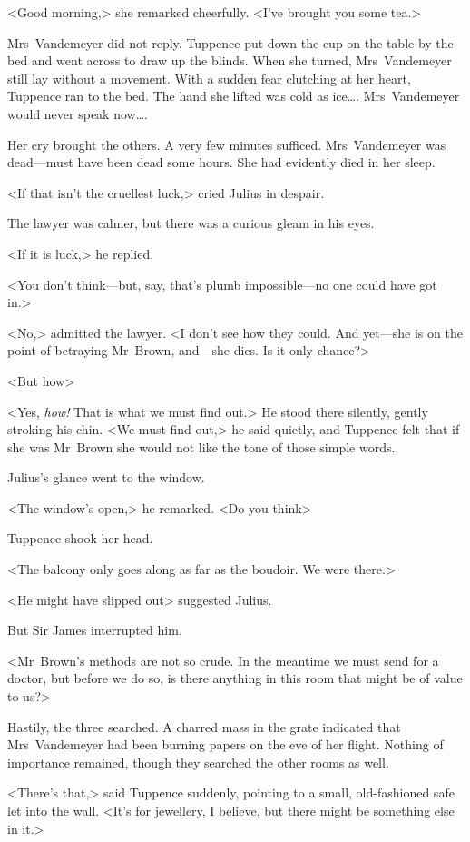 <Good morning,> she remarked cheerfully. <I've brought you some tea.>

Mrs~Vandemeyer did not reply. Tuppence put down the cup on the table by the bed and went across to draw up the blinds. When she turned, Mrs~Vandemeyer still lay without a movement. With a sudden fear clutching at her heart, Tuppence ran to the bed. The hand she lifted was cold as ice\dots. Mrs~Vandemeyer would never speak now\dots.

Her cry brought the others. A very few minutes sufficed. Mrs~Vandemeyer was dead—must have been dead some hours. She had evidently died in her sleep.

<If that isn't the cruellest luck,> cried Julius in despair.

The lawyer was calmer, but there was a curious gleam in his eyes.

<If it is luck,> he replied.

<You don't think—but, say, that's plumb impossible—no one could have got in.>

<No,> admitted the lawyer. <I don't see how they could. And yet—she is on the point of betraying Mr~Brown, and—she dies. Is it only chance?>

<But how\longdash>

<Yes, \emph{how!} That is what we must find out.> He stood there silently, gently stroking his chin. <We must find out,> he said quietly, and Tuppence felt that if she was Mr~Brown she would not like the tone of those simple words.

Julius's glance went to the window.

<The window's open,> he remarked. <Do you think\longdash>

Tuppence shook her head.

<The balcony only goes along as far as the boudoir. We were there.>

<He might have slipped out\longdash> suggested Julius.

But Sir James interrupted him.

<Mr~Brown's methods are not so crude. In the meantime we must send for a doctor, but before we do so, is there anything in this room that might be of value to us?>

Hastily, the three searched. A charred mass in the grate indicated that Mrs~Vandemeyer had been burning papers on the eve of her flight. Nothing of importance remained, though they searched the other rooms as well.

<There's that,> said Tuppence suddenly, pointing to a small, old-fashioned safe let into the wall. <It's for jewellery, I believe, but there might be something else in it.>

